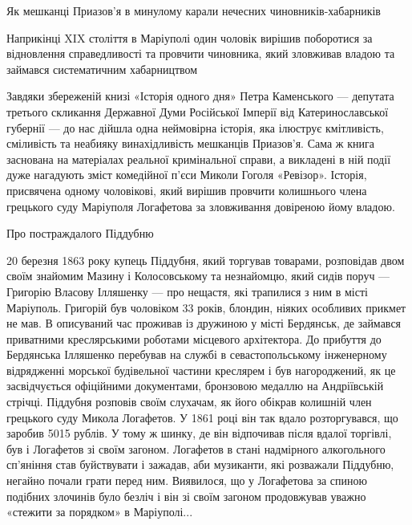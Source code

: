  
 
 
 
 

Як мешканці Приазов'я в минулому карали нечесних чиновників-хабарників

Наприкінці XIX століття в Маріуполі один чоловік вирішив поборотися за
відновлення справедливості та провчити чиновника, який зловживав владою та
займався систематичним хабарництвом

Завдяки збереженій книзі «Історія одного дня» Петра Каменського — депутата
третього скликання Державної Думи Російської Імперії від Катеринославської
губернії — до нас дійшла одна неймовірна історія, яка ілюструє кмітливість,
сміливість та неабияку винахідливість мешканців Приазов'я. Сама ж книга
заснована на матеріалах реальної кримінальної справи, а викладені в ній події
дуже нагадують зміст комедійної п'єси Миколи Гоголя «Ревізор». Історія,
присвячена одному чоловікові, який вирішив провчити колишнього члена грецького
суду Маріуполя Логафетова за зловживання довіреною йому владою.

Про постраждалого Піддубню

20 березня 1863 року купець Піддубня, який торгував товарами, розповідав двом
своїм знайомим Мазину і Колосовському та незнайомцю, який сидів поруч —
Григорію Власову Ілляшенку — про нещастя, які трапилися з ним в місті
Маріуполь. Григорій був чоловіком 33 років, блондин, ніяких особливих прикмет
не мав. В описуваний час проживав із дружиною у місті Бердянськ, де займався
приватними креслярськими роботами місцевого архітектора. До прибуття до
Бердянська Ілляшенко перебував на службі в севастопольському інженерному
відрядженні морської будівельної частини креслярем і був нагороджений, як це
засвідчується офіційними документами, бронзовою медаллю на Андріївській
стрічці. Піддубня розповів своїм слухачам, як його обікрав колишній член
грецького суду Микола Логафетов. У 1861 році він так вдало розторгувався, що
заробив 5015 рублів. У тому ж шинку, де він відпочивав після вдалої торгівлі,
був і Логафетов зі своїм загоном. Логафетов в стані надмірного алкогольного
сп'яніння став буйствувати і зажадав, аби музиканти, які розважали Піддубню,
негайно почали грати перед ним. Виявилося, що у Логафетова за спиною подібних
злочинів було безліч і він зі своїм загоном продовжував уважно «стежити за
порядком» в Маріуполі... 

